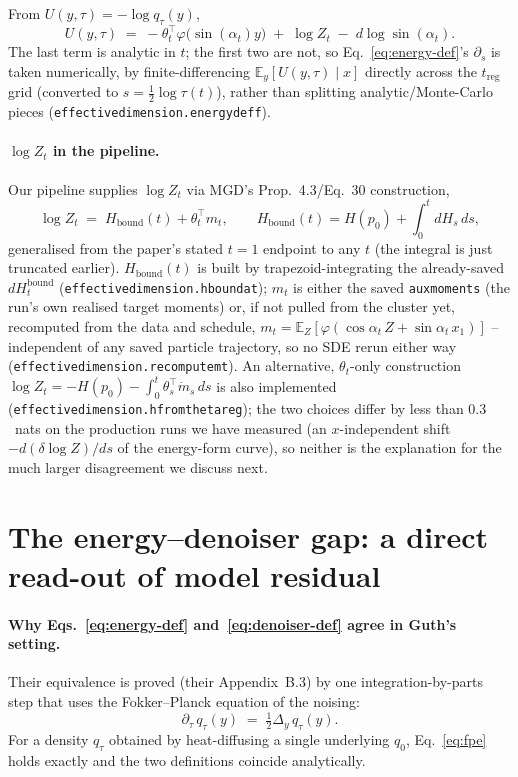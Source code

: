 \documentclass[11pt]{article}
\newcommand{\E}{\mathbb{E}}
\newcommand{\code}[1]{\texttt{#1}}
\renewcommand{\_}{\origunderscore\allowbreak}
\begin{document}
From $U(y,\tau) = -\log q_\tau(y)$,
\begin{equation}
  U(y,\tau) \;=\; -\theta_t^\top\varphi\big(\sin(\alpha_t) y\big) \;+\; \log Z_t
  \;-\; d\log\sin(\alpha_t).
  \label{eq:energy}
\end{equation}
The last term is analytic in $t$; the first two are not, so
Eq.~\ref{eq:energy-def}'s $\partial_s$ is taken numerically, by
finite-differencing $\E_y[U(y,\tau)\mid x]$ directly across the
$t_{\mathrm{reg}}$ grid (converted to $s=\tfrac12\log\tau(t)$), rather than
splitting analytic/Monte-Carlo pieces
(\code{effective\_dimension.energy\_d\_eff}).

\paragraph{$\log Z_t$ in the pipeline.} Our pipeline supplies $\log Z_t$ via
MGD's Prop.~4.3/Eq.~30 construction,
\begin{equation}
  \log Z_t \;=\; H_{\mathrm{bound}}(t) + \theta_t^\top m_t, \qquad
  H_{\mathrm{bound}}(t) = H(p_0) + \int_0^t dH_s\,ds,
  \label{eq:logZ-bound}
\end{equation}
generalised from the paper's stated $t=1$ endpoint to any $t$ (the integral
is just truncated earlier). $H_{\mathrm{bound}}(t)$ is built by
trapezoid-integrating the already-saved $dH_t^{\mathrm{bound}}$
(\code{effective\_dimension.h\_bound\_at}); $m_t$ is either the saved
\code{aux\_moments} (the run's own realised target moments) or, if not
pulled from the cluster yet, recomputed from the data and schedule,
$m_t = \E_{Z}[\varphi(\cos\alpha_t\,Z + \sin\alpha_t\,x_1)]$ -- independent
of any saved particle trajectory, so no SDE rerun either way
(\code{effective\_dimension.recompute\_m\_t}). An alternative, $\theta_t$-only
construction $\log Z_t = -H(p_0) - \int_0^t \theta_s^\top \dot m_s\,ds$ is also
implemented (\code{effective\_dimension.h\_from\_theta\_reg}); the two choices
differ by less than $0.3$~nats on the production runs we have measured
(an $x$-independent shift $-d(\delta\log Z)/ds$ of the energy-form curve),
so neither is the explanation for the much larger disagreement we discuss
next.

\section{The energy--denoiser gap: a direct read-out of model residual}
\label{sec:fpe-residual}

\paragraph{Why Eqs.~\ref{eq:energy-def} and~\ref{eq:denoiser-def} agree in
Guth's setting.} Their equivalence is proved (their Appendix~B.3) by one
integration-by-parts step that uses the Fokker--Planck equation of the
noising:
\begin{equation}
  \partial_\tau\, q_\tau(y) \;=\; \tfrac12 \Delta_y\, q_\tau(y).
  \label{eq:fpe}
\end{equation}
For a density $q_\tau$ obtained by heat-diffusing a single underlying $q_0$,
Eq.~\ref{eq:fpe} holds exactly and the two definitions coincide
analytically.
\end{document}
